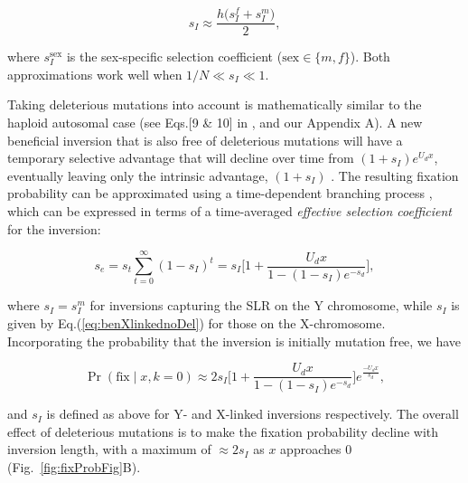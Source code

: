 \documentclass{article}[12pt]
\begin{document}
\begin{equation} \label{eq:benXlinkednoDel}
	s_{I} \approx \frac{h \big( s_{I}^{f} + s_{I}^{m} \big)}{2},
\end{equation}

\noindent where $s_{I}^{\text{sex}}$ is the sex-specific selection coefficient ($\text{sex} \in \{m,f\}$). Both approximations work well when $1/N \ll s_I \ll 1$.

Taking deleterious mutations into account is mathematically similar to the haploid autosomal case (see Eqs.[9 \& 10] in \citealt{ConnallonOlito2020}, and our Appendix A). A new beneficial inversion that is also free of deleterious mutations will have a temporary selective advantage that will decline over time from $(1 + s_I)e^{U_d x}$, eventually leaving only the intrinsic advantage, $(1 + s_I)$ \citep{Nei1967}. The resulting fixation probability can be approximated using a time-dependent branching process \citep{PeischlKirkpatrick2012, KirkpatrickPeischl2013}, which can be expressed in terms of a time-averaged {\itshape effective selection coefficient} for the inversion:

\begin{equation} \label{eq:benSe}
	s_{e} = s_t \sum_{t=0}^{\infty} (1 - s_I)^t = s_I \Bigg[1 + \frac{U_d x}{1 - (1-s_I)e^{-s_d}} \Bigg],
\end{equation}

\noindent where $s_I = s_{I}^{m}$ for inversions capturing the SLR on the Y chromosome, while $s_I$ is given by Eq.(\ref{eq:benXlinkednoDel}) for those on the X-chromosome. Incorporating the probability that the inversion is initially mutation free, we have

\begin{equation} \label{eq:benPrFix}
	\Pr(\text{fix} \mid x, k = 0) \approx 2 s_I \Bigg[ 1+ \frac{U_d x}{1 - (1-s_I)e^{-s_d}} \Bigg] e^{\frac{-U_d x}{s_d}},
\end{equation}

\noindent and $s_I$ is defined as above for Y- and X-linked inversions respectively. The overall effect of deleterious mutations is to make the fixation probability decline with inversion length, with a maximum of $\approx 2 s_I$ as $x$ approaches $0$ (Fig.~\ref{fig:fixProbFig}B). 
\vspace{12pt}

\end{document}
